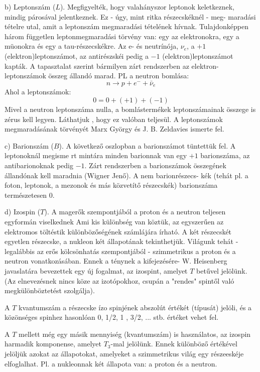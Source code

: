 \documentclass[../main.tex]{subfiles}
\begin{document}
b) Leptonszám ($L$). Megfigyelték, hogy valahányszor leptonok keletkeznek, mindig párosával jelentkeznek. Ez - úgy, mint ritka részecskéknél - meg-
maradási tételre utal, amit a leptonszám megmaradási tételének hívnak.
Tulajdonképpen három független leptonmegmaradási törvény van: egy az
elektronokra, egy a müonokra és egy a tau-részecskékre. Az e- és neutrínója, $\nu_e$, a $+1$ (elektron)leptonszámot, az antirészskéi pedig a $-1$ (elektron)leptonszámot kapták. A tapasztalat szerint bármilyen zárt rendszerben
az elektron-leptonszámok összeg állandó marad. PL a neutron bomlása:
\begin{equation}
    n \rightarrow p + e^- + \bar{\nu}_e
\end{equation}
Ahol a leptonszámok:
\begin{equation}
    0 = 0 + (+1) + (-1)
\end{equation}
Mivel a neutron leptonszáma nulla, a bomlástermékek leptonszámainak
összege is zérus kell legyen. Láthatjuk , hogy ez valóban teljesül. A leptonszámok megmaradásának törvényét Marx György és J. B. Zeldavies ismerte fel.

c) Barionszám ($B$). A következő oszlopban a barionszámot tüntettük
fel. A leptonoknál megisme rt mintára minden barionnak van egy $+1$ barionszáma, az antibarionoknak pedig $-1$. Zárt rendszerben a barionszámok
összegének állandónak kell maradnia (Wigner Jenő). A nem barionrészecs-
kék (tehát pl. a foton, leptonok, a mezonok és más közvetítő részecskék)
barionszáma természetesen $0$.

d) Izospin ($T$). A magerők szempontjából a proton és a neutron teljesen
egyformán viselkednek Ami kis különbség van köztük, az egyszerűen az
elektromos töltéstik különbözőségének számlájára írható. A két részecskét
egyetlen részecske, a nukleon két állapotának tekinthetjük. Világunk tehát
- legalábbis az erős kölcsönhatás szempontjából - szimmetrikus a proton és
a neutron vonatkozásában. Ennek a ténynek a kifejezésére- W. Heisenberg
javaslatára bevezettek egy új fogalmat, az izospint, amelyet $T$ betűvel
jelölünk. (Az elnevezésnek nincs köze az izotópokhoz, csupán a "rendes"
spintől való megkülönböztetést szolgálja).

A $T$ kvantumszám a részecske ízo spinjének abszolút értékét (típusát) jelöli, és a közönséges spinhez hasonlóan 0, 1/2, 1 , 3/2, ... stb. értéket vehet fel.

A $T$ mellett még egy másik mennyiség (kvantumszám) is használatos, az izospin harmadik komponense, amelyet $T_3$-mal jelölünk. Ennek különböző
értékével jelöljük azokat az állapotokat, amelyeket a szimmetrikus világ egy részeeskéje elfoglalhat. Pl. a nukleonnak két állapota van: a proton és a neutron.
\end{document}
